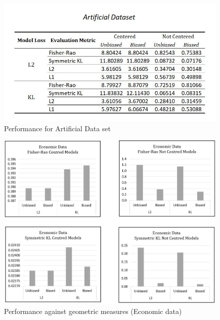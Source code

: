 \documentclass[BSc]{usydthesis}
\numberwithin{equation}{chapter}
\theoremstyle{remark}
\begin{document}
\begin{figure}[hbt!]
 \centering
 \includegraphics[scale=0.9,keepaspectratio=true]{table4.JPG}
 \caption{Performance for Artificial Data set}
\end{figure}

\newpage

\begin{figure}
 \centering
 \includegraphics[scale=0.6,keepaspectratio=true]{graphs/G-Eco1.JPG}
 \caption{Performance against geometric measures (Economic data)}
\end{figure}
\end{document}

